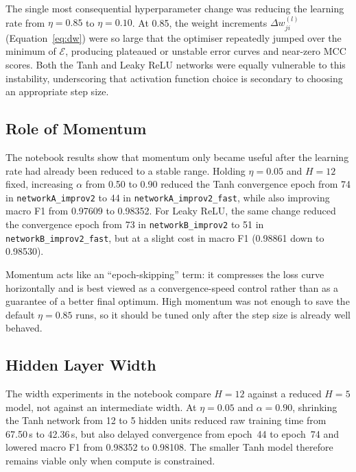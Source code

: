 \documentclass{acm_proc_article-sp}
\begin{document}
The single most consequential hyperparameter change was reducing the
learning rate from $\eta = 0.85$ to $\eta = 0.10$.  At 0.85, the weight
increments $\Delta w^{(l)}_{ji}$ (Equation~\ref{eq:dw}) were so large
that the optimiser repeatedly jumped over the minimum of
$\mathcal{E}$, producing plateaued or unstable error curves and
near-zero MCC scores.
Both the Tanh and Leaky ReLU networks were equally vulnerable to this
instability, underscoring that activation function choice is secondary to
choosing an appropriate step size.

\subsection{Role of Momentum}

\begin{sloppypar}
The notebook results show that momentum only became useful after the
learning rate had already been reduced to a stable range. Holding
$\eta=0.05$ and $H=12$ fixed, increasing $\alpha$ from 0.50 to 0.90
reduced the Tanh convergence epoch from 74 in
\texttt{networkA\_improv2} to 44 in
\texttt{networkA\_improv2\_fast}, while also improving macro F1 from
0.97609 to 0.98352. For Leaky ReLU, the same change reduced the
convergence epoch from 73 in \texttt{networkB\_improv2} to 51 in
\texttt{networkB\_improv2\_fast}, but at a slight cost in macro F1
(0.98861 down to 0.98530).
\end{sloppypar}

Momentum acts like an ``epoch-skipping'' term: it compresses the loss
curve horizontally and is best viewed as a convergence-speed control
rather than as a guarantee of a better final optimum. High momentum was
not enough to save the default $\eta=0.85$ runs, so it should be tuned
only after the step size is already well behaved.

\subsection{Hidden Layer Width}

The width experiments in the notebook compare $H=12$ against a reduced
$H=5$ model, not against an intermediate width.  At $\eta=0.05$ and
$\alpha=0.90$, shrinking the Tanh network from 12 to 5 hidden units
reduced raw training time from 67.50\,s to 42.36\,s, but also delayed
convergence from epoch~44 to epoch~74 and lowered macro F1 from 0.98352
to 0.98108.  The smaller Tanh model therefore remains viable only when
compute is constrained.
\end{document}
